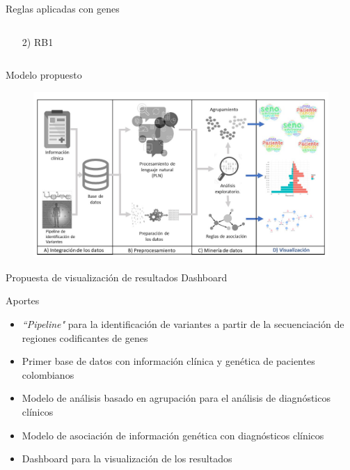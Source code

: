 \documentclass[xcolor=dvipsnames]{beamer}
\begin{document}
\begin{frame}{Reglas aplicadas con genes}
\begin{columns}
\begin{column}{0.5\textwidth}
\begin{center}
    \begin{itemize}
    \centering
    \item[2)] RB1
    \end{itemize}
    \end{center}
\end{column}
\end{columns}
\end{frame}

\begin{frame}{Modelo propuesto}
\begin{figure}
	\includegraphics[width=1\textwidth]{Slide5.JPG}
\end{figure}
\end{frame}

\begin{frame}{Propuesta de visualización de resultados}
Dashboard
\end{frame}

\begin{frame}{Aportes}
\begin{itemize}
	\justifying
	\item \textit{``Pipeline"} para la identificación de variantes a partir de la secuenciación de regiones codificantes de genes
	\item Primer base de datos con información clínica y genética de pacientes colombianos
	\item Modelo de análisis basado en agrupación para el análisis de diagnósticos clínicos
	\item Modelo de asociación de información genética con diagnósticos clínicos
	\item Dashboard para la visualización de los resultados
\end{itemize}
\end{frame}
\end{document}
